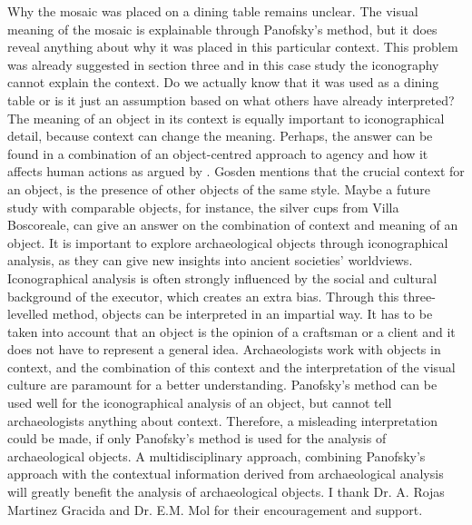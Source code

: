 	Why the mosaic was placed on a dining table remains unclear. The visual meaning of the mosaic is explainable through Panofsky’s method, but it does reveal anything about why it was placed in this particular context. This problem was already suggested in section three and in this case study the iconography cannot explain the context. Do we actually know that it was used as a dining table or is it just an assumption based on what others have already interpreted? The meaning of an object in its context is equally important to iconographical detail, because context can change the meaning. Perhaps, the answer can be found in a combination of an object-centred approach to agency and how it affects human actions as argued by \textcite [196--197] {Gosden_2005}. Gosden mentions that the crucial context for an object, is the presence of other objects of the same style. Maybe a future study with comparable objects, for instance, the silver cups from Villa Boscoreale, can give an answer on the combination of context and meaning of an object.
	It is important to explore archaeological objects through iconographical analysis, as they can give new insights into ancient societies’ worldviews. Iconographical analysis is often strongly influenced by the social and cultural background of the executor, which creates an extra bias. Through this three-levelled method, objects can be interpreted in an impartial way. It has to be taken into account that an object is the opinion of a craftsman or a client and it does not have to represent a general idea. 
	Archaeologists work with objects in context, and the combination of this context and the interpretation of the visual culture are paramount for a better understanding. Panofsky’s method can be used well for the iconographical analysis of an object, but cannot tell archaeologists anything about context. Therefore, a misleading interpretation could be made, if only Panofsky’s method is used for the analysis of archaeological objects. A multidisciplinary approach, combining Panofsky’s approach with the contextual information derived from archaeological analysis will greatly benefit the analysis of archaeological objects.
	\myseparator
	I thank Dr. A. Rojas Martinez Gracida and Dr. E.M. Mol for their encouragement and support.
	
